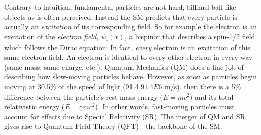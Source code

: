 Contrary to intuition, fundamental particles are not hard, billiard-ball-like objects as is often perceived.
Instead the SM predicts that every particle is actually an \emph{excitation} of its corresponding field.
So for example the electron is an excitation of the \emph{electron field}, $\psi_{e}(x)$, a bispinor that describes a spin-1/2 field which follows the Dirac equation: 
In fact, \emph{every} electron is an excitation of this same electron field. 
An electron is identical to every other electron in every way (same mass, same charge, etc.).
Quantum Mechanics (QM) does a fine job of describing how slow-moving particles behave.
However, as soon as particles begin moving at 30.5\% of the speed of light (91.4 $91.4 E6$ m/s), then there is a 5\% difference between the particle's rest mass energy ($E = mc^2$) and its total relativistic energy ($E = \gamma mc^2$).
In other words, fast-moving particles must account for effects due to Special Relativity (SR).
The merger of QM and SR gives rise to Quantum Field Theory (QFT) - the backbone of the SM.

